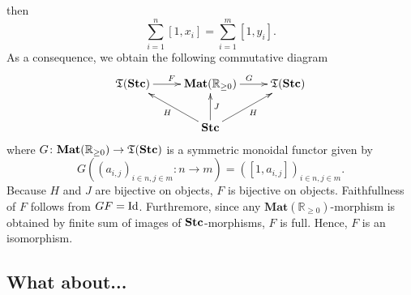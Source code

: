then
\begin{equation*}
  \sum_{i = 1}^{n}[1,x_{i}] = \sum_{i = 1}^{m}[1,y_{i}].
\end{equation*}
As a consequence, we obtain the following
commutative diagram
\begin{equation*}
  \xymatrix{
    \mathfrak{T}(\Stc) \ar[r]^{F} &
    \mathbf{Mat}(\mathbb{R}_{\geq 0}) \ar[r]^{G} & \mathfrak{T}(\Stc) \\
    & \Stc \ar[lu]^{H} \ar[u]_{J} \ar[ru]_{H} &
  }
\end{equation*}
where $G \colon \mathbf{Mat}(\mathbb{R}_{\geq 0}) \to \mathfrak{T}(\mathbf{Stc})$
is a symmetric monoidal functor given by
\begin{equation*}
  G((a_{i,j})_{i \in n, j \in m} \colon n \to m) =
  ([1,a_{i,j}])_{i \in n, j \in m}.
\end{equation*}
Because $H$ and $J$ are bijective on objects,
$F$ is bijective on objects. Faithfullness of $F$
follows from $GF=\mbox{Id}$. Furthremore,
since any $\mathbf{Mat}(\mathbb{R}_{\geq 0})$-morphism
is obtained by finite sum of images of $\mathbf{Stc}$-morphisms,
$F$ is full. Hence, $F$ is an isomorphism.




\subsection{What about...}

